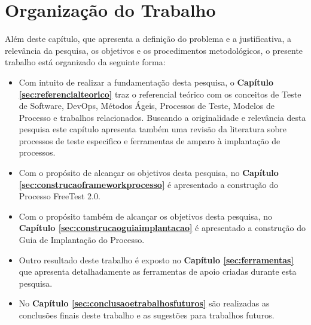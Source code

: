 \section{Organização do Trabalho}
\label{cap:estrutura}

Além deste capítulo, que apresenta a definição do problema e a justificativa, a relevância da pesquisa, os objetivos e os procedimentos metodológicos, o presente trabalho está organizado da seguinte forma:

\begin{itemize}
    \item Com intuito de realizar a fundamentação desta pesquisa, o \textbf{Capítulo     \ref{sec:referencialteorico}} traz o referencial teórico com os conceitos de Teste de Software, DevOps, Métodos Ágeis, Processos de Teste, Modelos de Processo e trabalhos relacionados. Buscando a originalidade e relevância desta pesquisa este capítulo apresenta também uma revisão da literatura sobre processos de teste especifico e ferramentas de amparo à implantação de processos.
    \item Com o propósito de alcançar os objetivos desta pesquisa, no \textbf{Capítulo \ref{sec:construcaoframeworkprocesso}} é apresentado a construção do Processo FreeTest 2.0.
    \item Com o propósito também de alcançar os objetivos desta pesquisa, no \textbf{Capítulo \ref{sec:construcaoguiaimplantacao}} é apresentado a construção do Guia de Implantação do Processo.
    \item Outro resultado deste trabalho é exposto no \textbf{Capítulo \ref{sec:ferramentas}} que apresenta detalhadamente as ferramentas de apoio criadas durante esta pesquisa.
    \item No \textbf{Capítulo \ref{sec:conclusaoetrabalhosfuturos}} são realizadas as conclusões finais deste trabalho e as sugestões para trabalhos futuros.
\end{itemize}